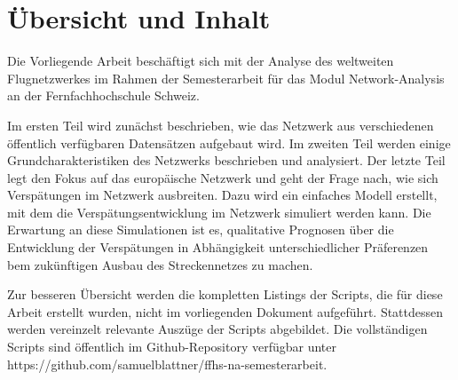 \section{Übersicht und Inhalt}
\label{sec:contents}

Die Vorliegende Arbeit beschäftigt sich mit der Analyse des weltweiten Flugnetzwerkes im Rahmen der Semesterarbeit für
das Modul Network-Analysis an der Fernfachhochschule Schweiz.

Im ersten Teil wird zunächst beschrieben, wie das Netzwerk aus verschiedenen öffentlich verfügbaren Datensätzen
aufgebaut wird.
Im zweiten Teil werden einige Grundcharakteristiken des Netzwerks beschrieben und analysiert.
Der letzte Teil legt den Fokus auf das europäische Netzwerk und geht der Frage nach, wie sich Verspätungen im Netzwerk
ausbreiten.
Dazu wird ein einfaches Modell erstellt, mit dem die Verspätungsentwicklung im Netzwerk simuliert werden kann.
Die Erwartung an diese Simulationen ist es, qualitative Prognosen über die Entwicklung der Verspätungen in Abhängigkeit
unterschiedlicher Präferenzen bem zukünftigen Ausbau des Streckennetzes zu machen.

Zur besseren Übersicht werden die kompletten Listings der Scripts, die für diese Arbeit erstellt wurden, nicht im
vorliegenden Dokument aufgeführt.
Stattdessen werden vereinzelt relevante Auszüge der Scripts abgebildet.
Die vollständigen Scripts sind öffentlich im Github-Repository verfügbar unter https://github.com/samuelblattner/ffhs-na-semesterarbeit.
